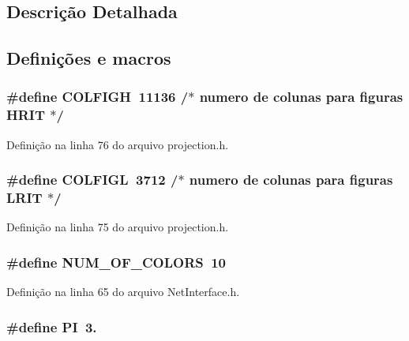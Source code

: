 \subsection{Descrição Detalhada}


\subsection{Definições e macros}
\subsubsection[{C\+O\+L\+F\+I\+GH}]{\setlength{\rightskip}{0pt plus 5cm}\#define C\+O\+L\+F\+I\+GH~11136               /$\ast$ numero de colunas para figuras H\+R\+IT              $\ast$/}\label{group___network_gaf6973920457df6c8a0709d09f8a4e9c0}


Definição na linha 76 do arquivo projection.\+h.

\subsubsection[{C\+O\+L\+F\+I\+GL}]{\setlength{\rightskip}{0pt plus 5cm}\#define C\+O\+L\+F\+I\+GL~3712               /$\ast$ numero de colunas para figuras L\+R\+IT              $\ast$/}\label{group___network_ga07b0fc8834356f059a9023d1b31f3487}


Definição na linha 75 do arquivo projection.\+h.

\subsubsection[{N\+U\+M\+\_\+\+O\+F\+\_\+\+C\+O\+L\+O\+RS}]{\setlength{\rightskip}{0pt plus 5cm}\#define N\+U\+M\+\_\+\+O\+F\+\_\+\+C\+O\+L\+O\+RS~10}\label{group___network_gaeb03416903eb28620662b479e7d7be19}


Definição na linha 65 do arquivo Net\+Interface.\+h.

\subsubsection[{PI}]{\setlength{\rightskip}{0pt plus 5cm}\#define PI~3.}\label{group___network_ga598a3330b3c21701223ee0ca14316eca}


